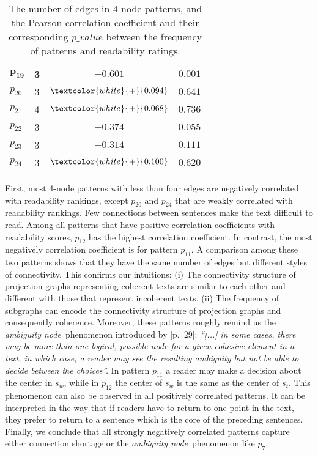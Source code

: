 \begin{table}[!ht]
\begin{center}
\begin{tabular}{lccc}
			$\mathbf{p_{19}}$	& \textbf{3} 	  & $\mathbf{-0.601}$ 				& $\mathbf{0.001}$			\\
			$p_{20}$			& 3 			  & $\textcolor{white}{+}{0.094}$   & $0.641$					\\
			$p_{21}$			& 4 			  & $\textcolor{white}{+}{0.068}$	& $0.736$				    \\
			$p_{22}$			& 3				  & $-0.374$ 						& $0.055$					\\
			$p_{23}$			& 3				  & $-0.314$ 						& $0.111$					\\
			$p_{24}$ 			& 3				  & $\textcolor{white}{+}{0.100}$   & $0.620$					\\
			\hline
		\end{tabular}
	\end{center}
	\caption{The number of edges in 4-node patterns, and the Pearson correlation coefficient and their corresponding $p\_value$ between the frequency of patterns and readability ratings.} 
	\label{tab:correlation-4node}
\end{table}

First, most 4-node patterns with less than four edges are negatively correlated with readability rankings, except $p_{20}$ and $p_{24}$ that are weakly correlated with readability rankings. 
Few connections between sentences make the text difficult to read.
Among all patterns that have positive correlation coefficients with readability scores, $p_{12}$ has the highest correlation coefficient. 
In contrast, the most negatively correlation coefficient is for pattern $p_{11}$. 
A comparison among these two patterns shows that they have the same number of edges but different styles of connectivity.
This confirms our intuitions: (i) The connectivity structure of projection graphs representing coherent texts are similar to each other and different with those that represent incoherent texts. 
(ii) The frequency of subgraphs can encode the connectivity structure of projection graphs and consequently coherence. 
Moreover, these patterns roughly remind us the \emph{ambiguity node}\ phenomenon introduced by  [p.\ 29]: 
\emph{
	``[...] in some cases, there may be more
	than one logical, possible node for a given cohesive element in a text, in which case, a reader may see the resulting ambiguity but not be able to decide between the choices''.
	}
In pattern $p_{11}$ a reader may make a decision about the center in $s_w$, while in $p_{12}$ the center of $s_w$ is the same as the center of $s_t$. 
This phenomenon can also be observed in all positively correlated patterns.  
It can be interpreted in the way that if readers have to return to one point in the text, they prefer to return to a sentence which is the core of the preceding sentences.
Finally, we conclude that all strongly negatively correlated patterns capture either connection shortage or the \textit{ambiguity node}\ phenomenon like $p_7$.

